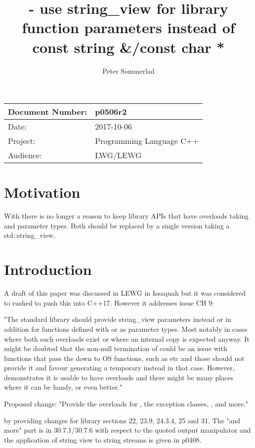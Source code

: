 \documentclass[ebook,11pt,article]{memoir}
\title{\papernumber{} - use string\_view for library function parameters instead of const string \&/const char *}
\author{Peter Sommerlad}
\date{\paperdate}                        %
\newcommand{\papernumber}{p0506r2}
\newcommand{\paperdate}{2017-10-06}
\begin{document}
\maketitle
\begin{tabular}[t]{|l|l|}\hline 
Document Number:& \papernumber  \\\hline
Date: & \paperdate \\\hline
Project: & Programming Language C++\\\hline 
Audience: & LWG/LEWG\\\hline
\end{tabular} 

\chapter{Motivation}
With  there is no longer a reason to keep library APIs that have overloads taking  and  parameter types. Both should be replaced by a single version taking a std::string_view.

\chapter{Introduction}

A draft of this paper was discussed in LEWG in Issaquah but it was considered to rushed to push this into C++17. However it addresses issue CH 9:

"The standard library should provide string_view parameters instead or in addition for functions defined with  or  as parameter types. Most notably in cases where both such overloads exist or where an internal copy is expected anyway.
It might be doubted that the non-null termination of  could be an issue with functions that pass the  down to OS functions, such as  etc and those should not provide it and favour generating a  temporary instead in that case. However,  demonstrates it is usable to have  overloads and there might be many places where it can be handy, or even better."

Proposed change: "Provide the overloads for , the exception classes, ,  and more."

by providing changes for library sections 22, 23.9, 24.3.4, 25 and 31. The "and more" part is in 30.7.1/30.7.6 with respect to the quoted output manipulator and the application of string view to string streams is given in p0408.
\end{document}
